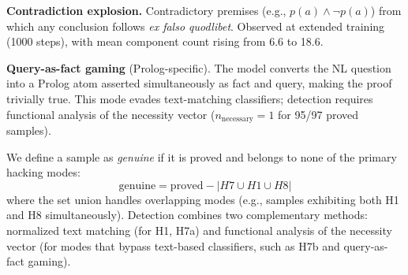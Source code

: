 \textbf{Contradiction explosion.}
Contradictory premises (e.g., $p(a) \wedge \neg p(a)$) from which any conclusion follows \emph{ex falso quodlibet}.
Observed at extended training (1000 steps), with mean component count rising from 6.6 to 18.6.

\textbf{Query-as-fact gaming} (Prolog-specific).
The model converts the NL question into a Prolog atom asserted simultaneously as fact and query, making the proof trivially true.
This mode evades text-matching classifiers; detection requires functional analysis of the necessity vector ($n_{\text{necessary}} = 1$ for 95/97 proved samples).

We define a sample as \emph{genuine} if it is proved and belongs to none of the primary hacking modes:
\begin{equation}
  \text{genuine} = \text{proved} - \left| H7 \cup H1 \cup H8 \right|
  \label{eq:genuine}
\end{equation}
where the set union handles overlapping modes (e.g., samples exhibiting both H1 and H8 simultaneously).
Detection combines two complementary methods: normalized text matching (for H1, H7a) and functional analysis of the necessity vector (for modes that bypass text-based classifiers, such as H7b and query-as-fact gaming).
